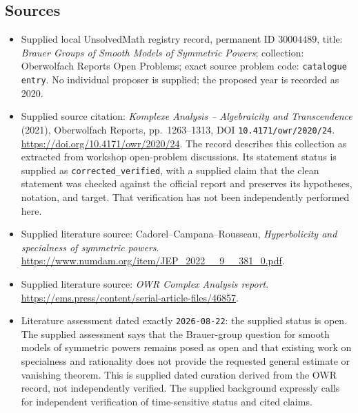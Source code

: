 \documentclass[11pt]{article}
\begin{document}
\subsection{Sources}
\begin{itemize}
\item Supplied local UnsolvedMath registry record, permanent ID \(30004489\), title: \emph{Brauer Groups of Smooth Models of Symmetric Powers}; collection: Oberwolfach Reports Open Problems; exact source problem code: \texttt{catalogue entry}. No individual proposer is supplied; the proposed year is recorded as 2020.
\item Supplied source citation: \emph{Komplexe Analysis -- Algebraicity and Transcendence} (2021), Oberwolfach Reports, pp.\ 1263--1313, DOI \texttt{10.4171/owr/2020/24}. \url{https://doi.org/10.4171/owr/2020/24}. The record describes this collection as extracted from workshop open-problem discussions. Its statement status is supplied as \texttt{corrected\_verified}, with a supplied claim that the clean statement was checked against the official report and preserves its hypotheses, notation, and target. That verification has not been independently performed here.
\item Supplied literature source: Cadorel--Campana--Rousseau, \emph{Hyperbolicity and specialness of symmetric powers}. \url{https://www.numdam.org/item/JEP_2022__9__381_0.pdf}.
\item Supplied literature source: \emph{OWR Complex Analysis report}. \url{https://ems.press/content/serial-article-files/46857}.
\item Literature assessment dated exactly \texttt{2026-08-22}: the supplied status is open. The supplied assessment says that the Brauer-group question for smooth models of symmetric powers remains posed as open and that existing work on specialness and rationality does not provide the requested general estimate or vanishing theorem. This is supplied dated curation derived from the OWR record, not independently verified. The supplied background expressly calls for independent verification of time-sensitive status and cited claims.
\end{itemize}
\end{document}
